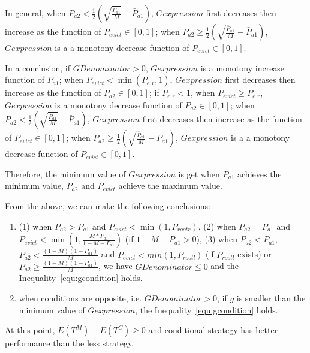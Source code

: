 \begin{enumerate}
In general, when $P_{a2}< \frac{1}{2}(\sqrt{\frac{\bar{P}_{a1}}{M}}-\bar{P}_{a1})$, $Gexpression$ first decreases then increase as the function of $P_{evict} \in [0,1]$; when $P_{a2}\geq \frac{1}{2}(\sqrt{\frac{\bar{P}_{a1}}{M}}-\bar{P}_{a1})$, $Gexpression$ is a  a monotony decrease function of $P_{evict} \in [0,1]$.

In a conclusion, if $GDenominator > 0$,
$Gexpression$ is a monotony increase function of $P_{a1}$;
 when $P_{evict} < \min(P_{e\_r},1)$, $Gexpression$ first decreases then increase as the function of $P_{a2} \in [0,1]$;
 if $P_{e\_r} < 1$, when $P_{evict} \geq P_{e\_r}$, $Gexpression$ is a monotony decrease function of $P_{a2} \in [0,1]$;
when $P_{a2}< \frac{1}{2}(\sqrt{\frac{\bar{P}_{a1}}{M}}-\bar{P}_{a1})$, $Gexpression$ first decreases then increase as the function of $P_{evict} \in [0,1]$; when $P_{a2}\geq \frac{1}{2}(\sqrt{\frac{\bar{P}_{a1}}{M}}-\bar{P}_{a1})$, $Gexpression$ is a  a monotony decrease function of $P_{evict} \in [0,1]$.

Therefore, the minimum value of $Gexpression$ is get when $P_{a1}$ achieves the minimum value, $P_{a2}$ and $P_{evict}$ achieve the maximum value.
\end{enumerate}

From the above, we can make the following conclusions:
\begin{enumerate}
  \item 
  (1) when $P_{a2}>P_{a1}$ and $P_{evict}< \min(1,P_{rootr})$,
  (2) when $P_{a2}=P_{a1}$ and $P_{evict}< \min(1,\frac{M*P_{a1}}{1-M-P_{a1}})$ (if $1-M-P_{a1}>0$),
  (3) when $P_{a2}<P_{a1}$, $P_{a2} < \frac{(1-M)(1-P_{a1})}{M}$ and $P_{evict}< min(1,P_{rootl})$ (if $P_{rootl}$ exists)
or $P_{a2}\geq \frac{(1-M)(1-P_{a1})}{M}$,
  we have $GDenominator\leq0$ and the Inequality~\ref{equ:gcondition} holds.
     
  \item 
  when conditions are opposite, i.e. $GDenominator>0$,  if $g$ is smaller than the minimum value of $Gexpression$, the Inequality~\ref{equ:gcondition} holds.
  
\end{enumerate}
At this point, $E(T^{M}) - E(T^{C})\geq 0$ and conditional {\vwarm} strategy has better performance than the less {\vwarm} strategy.




